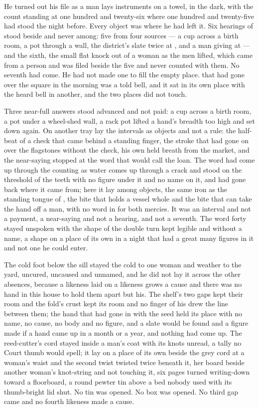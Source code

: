 He turned out his file as a man lays instruments on a towel, in the dark, with the count standing at one hundred and twenty-six where one hundred and twenty-five had stood the night before. Every object was where he had left it. Six hearings of  stood beside and never among: five from four sources --- a cup across a birth room, a pot through a wall, the district's slate twice at , and a man giving at  --- and the sixth, the small flat knock out of a woman as the men lifted, which came from a person and was filed beside the five and never counted with them. No seventh had come. He had not made one to fill the empty place.  that had gone over the square in the morning was a told bell, and it sat in its own place with the heard bell in another, and the two places did not touch.

Three near-full answers stood advanced and not paid: a cup across a birth room, a pot under a wheel-shed wall, a rack pot lifted a hand's breadth too high and set down again. On another tray lay the intervals as objects and not a rule: the half-beat of a check that came behind a standing finger, the stroke that had gone on over the flagstones without the check, his own held breath from the market, and the near-saying stopped at the word that would call the loan. The word had come up through the counting as water comes up through a crack and stood on the threshold of the teeth with no figure under it and no name on it, and had gone back where it came from; here it lay among objects, the same iron as the standing tongue of , the bite that holds a vessel whole and the bite that can take the hand off a man, with no word in  for both mercies. It was an interval and not a payment, a near-saying and not a hearing, and not a seventh. The word forty stayed unspoken with the shape of the double turn kept legible and without a name, a shape on a place of its own in a night that had a great many figures in it and not one he could enter.

The cold foot below the sill stayed the cold to one woman and weather to the yard, uncured, uncaused and unnamed, and he did not lay it across the other absences, because a likeness laid on a likeness grows a cause and there was no hand in this house to hold them apart but his. The shelf's two gaps kept their room and the fold's crust kept its room and no finger of his drew the line between them; the hand that had gone in with the seed held its place with no name, no cause, no body and no figure, and a slate would be found and a figure made if a hand came up in a month or a year, and nothing had come up. The reed-cutter's cord stayed inside a man's coat with its knots unread, a tally no Court thumb would spell; it lay on a place of its own beside the grey cord at a woman's waist and the second twist twisted twice beneath it, her board beside another woman's knot-string and not touching it, six pages turned writing-down toward a floorboard, a round pewter tin above a bed nobody used with its thumb-bright lid shut. No tin was opened. No box was opened. No third gap came and no fourth likeness made a cause.


